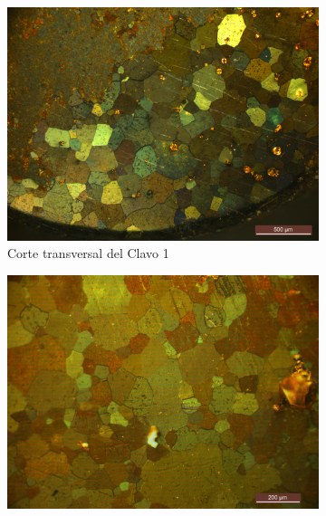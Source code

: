 \documentclass[a4paper,12pt,fleqn,twoside,openany]{book}
\begin{document}
  \begin{figure}%
    \centering
    
    ~ %
    \begin{subfigure}{0.3\textwidth}
        \includegraphics[width=\textwidth]{Img/Resultados/clavos/tg/Clavo1.jpg}
        \caption{Corte transversal del Clavo 1}%
        \label{fig: MClavo1}
    \end{subfigure}
        \begin{subfigure}{0.3\textwidth}
        \includegraphics[width=\textwidth]{Img/Resultados/clavos/tg/Clavo2.jpg}

\end{subfigure}
\end{figure}
\end{document}
